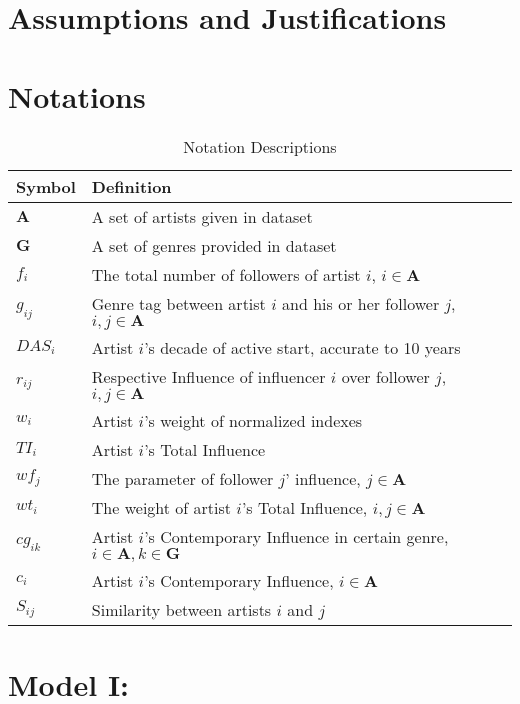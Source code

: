 \documentclass{mcmthesis}
\numberwithin{figure}{section}
\numberwithin{table}{section}
\numberwithin{equation}{section}
\begin{document}
\section{Assumptions and Justifications}



\section{Notations}

\renewcommand\arraystretch{1.5}

\begin{table}[htpb!]
  \centering
  \caption{Notation Descriptions} \label{Varibles}
  \begin{tabular}{m{2.5cm}<{\centering}|m{12.5cm}<{\centering}}
  \toprule[1.5pt]
  \textbf{Symbol} & \textbf{Definition} \\ \hline
  $\mathbf{A}$ & A set of artists given in dataset \\
  $\mathbf{G}$ & A set of genres provided in dataset \\
  $f_i$ & The total number of followers of artist $i$, $i\in \mathbf{A}$ \\
  $g_{ij}$ & Genre tag between artist $i$ and his or her follower $j$, $i,j \in \mathbf{A}$ \\
  $DAS_{i}$ & Artist $i$'s decade of active start, accurate to 10 years \\
  $r_{ij}$ & Respective Influence of influencer $i$ over follower $j$, $i,j \in \mathbf{A}$ \\
  $w_{i}$ & Artist $i$'s weight of normalized indexes \\ 
  $TI_{i} $ & Artist $i$'s Total Influence \\
  $wf_j$ & The parameter of follower $j$' influence, $j\in \mathbf{A}$ \\
  $wt_{i}$ & The weight of artist $i$'s Total Influence, $i,j\in \mathbf{A}$\\
  $cg_{ik}$ & Artist $i$'s Contemporary Influence in certain genre, $i\in \mathbf{A}, k \in \mathbf{G}$ \\
  $c_{i}$ & Artist $i$'s Contemporary Influence, $i\in \mathbf{A}$ \\
  $S_{ij} $ & Similarity between artists $i$ and $j$ \\
  \bottomrule[1.5pt]
  \end{tabular}
  \end{table}




\section{Model I:}
\end{document}

